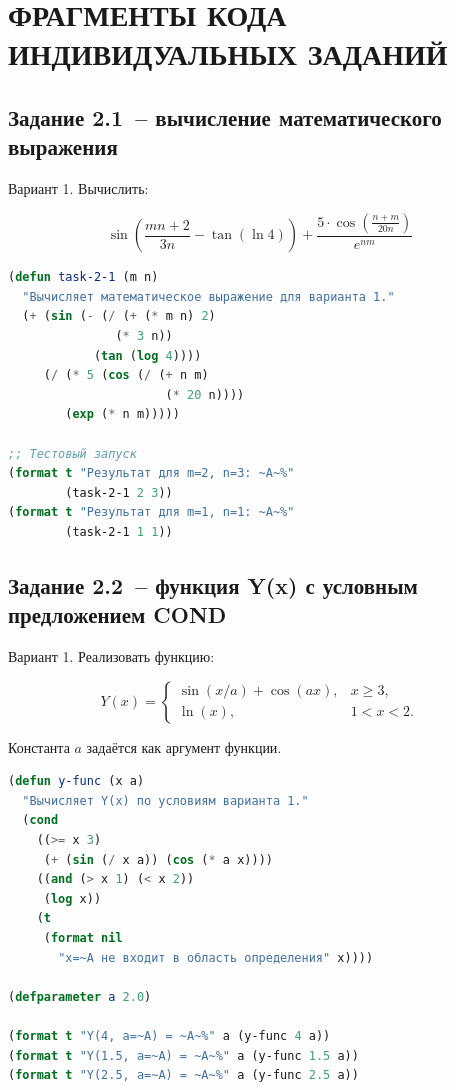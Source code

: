 \documentclass[14pt,a4paper]{extarticle}
\begin{document}
\newpage

\section{ФРАГМЕНТЫ КОДА ИНДИВИДУАЛЬНЫХ ЗАДАНИЙ}

\subsection{Задание 2.1~-- вычисление математического выражения}

Вариант 1. Вычислить:

\begin{equation}
\sin\left(\frac{mn + 2}{3n} - \tan(\ln 4)\right) + \frac{5 \cdot \cos\left(\frac{n + m}{20n}\right)}{e^{nm}}
\label{eq:task21}
\end{equation}

\begin{lstlisting}[caption={Задание 2.1~-- математическое выражение (task2\_1.lisp)}, language=Lisp]
(defun task-2-1 (m n)
  "Вычисляет математическое выражение для варианта 1."
  (+ (sin (- (/ (+ (* m n) 2)
               (* 3 n))
            (tan (log 4))))
     (/ (* 5 (cos (/ (+ n m)
                      (* 20 n))))
        (exp (* n m)))))

;; Тестовый запуск
(format t "Результат для m=2, n=3: ~A~%"
        (task-2-1 2 3))
(format t "Результат для m=1, n=1: ~A~%"
        (task-2-1 1 1))
\end{lstlisting}

\newpage

\subsection{Задание 2.2~-- функция Y(x) с условным предложением COND}

Вариант 1. Реализовать функцию:

\begin{equation}
Y(x) = \begin{cases}
  \sin(x / a) + \cos(ax), & x \geq 3, \\
  \ln(x), & 1 < x < 2.
\end{cases}
\label{eq:task22}
\end{equation}

Константа $a$ задаётся как аргумент функции.

\begin{lstlisting}[caption={Задание 2.2~-- функция Y(x) (task2\_2.lisp)}, language=Lisp]
(defun y-func (x a)
  "Вычисляет Y(x) по условиям варианта 1."
  (cond
    ((>= x 3)
     (+ (sin (/ x a)) (cos (* a x))))
    ((and (> x 1) (< x 2))
     (log x))
    (t
     (format nil
       "x=~A не входит в область определения" x))))

(defparameter a 2.0)

(format t "Y(4, a=~A) = ~A~%" a (y-func 4 a))
(format t "Y(1.5, a=~A) = ~A~%" a (y-func 1.5 a))
(format t "Y(2.5, a=~A) = ~A~%" a (y-func 2.5 a))
\end{lstlisting}
\end{document}
